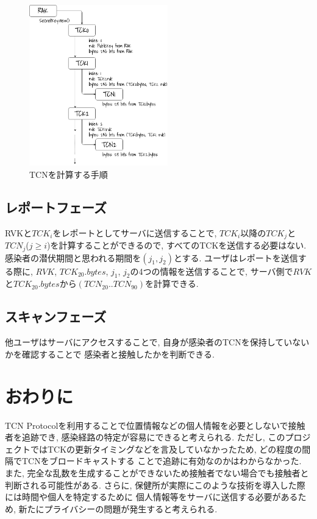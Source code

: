 \documentclass[twocolumn,10pt]{ltjsarticle}
\begin{document}
\begin{figure}[htb]
    \centering
    \includegraphics[width=6cm]{images/【調査】感染症の接触段階における有効な追跡技術/TCNProtocol.png}
    \caption{TCNを計算する手順}
    \label{fig:calc_tcn}
\end{figure}

\subsection{レポートフェーズ}
RVKと${TCK_i}$をレポートとしてサーバに送信することで, ${TCK_i}$以降の${TCK_j}$と
${TCN_j}$(${j \geq i}$)を計算することができるので, すべてのTCKを送信する必要はない. 
感染者の潜伏期間と思われる期間を${(j_1, j_2)}$とする. 
ユーザはレポートを送信する際に, ${RVK}$, ${TCK_{20}.bytes}$, ${j_1}$, ${j_2}$の4つの情報を送信することで, 
サーバ側で${RVK}$と${TCK_{20}.bytes}$から${(TCN_{20}..TCN_{90})}$を計算できる. 

\subsection{スキャンフェーズ}
他ユーザはサーバにアクセスすることで, 自身が感染者のTCNを保持していないかを確認することで
感染者と接触したかを判断できる. 

\section{おわりに}
TCN Protocolを利用することで位置情報などの個人情報を必要としないで接触者を追跡でき, 
感染経路の特定が容易にできると考えられる. 
ただし, このプロジェクトではTCKの更新タイミングなどを言及していなかったため, どの程度の間隔でTCNをブロードキャストする
ことで追跡に有効なのかはわからなかった. 
また, 完全な乱数を生成することができないため接触者でない場合でも接触者と判断される可能性がある. 
さらに, 保健所が実際にこのような技術を導入した際には時間や個人を特定するために
個人情報等をサーバに送信する必要があるため, 新たにプライバシーの問題が発生すると考えられる. 



\end{document}
